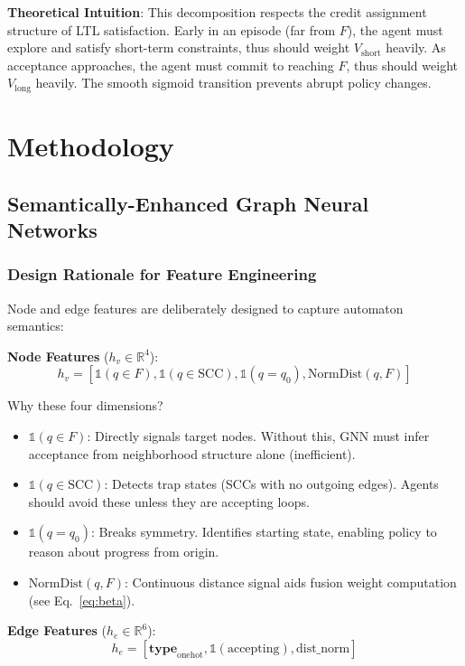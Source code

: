 \documentclass[conference]{IEEEtran}
\begin{document}
\textbf{Theoretical Intuition}: This decomposition respects the credit assignment structure of LTL satisfaction. Early in an episode (far from $F$), the agent must explore and satisfy short-term constraints, thus should weight $V_{\text{short}}$ heavily. As acceptance approaches, the agent must commit to reaching $F$, thus should weight $V_{\text{long}}$ heavily. The smooth sigmoid transition prevents abrupt policy changes.

\section{Methodology}
\label{sec:method}

\subsection{Semantically-Enhanced Graph Neural Networks}

\subsubsection{Design Rationale for Feature Engineering}

Node and edge features are deliberately designed to capture automaton semantics:

\textbf{Node Features} ($h_v \in \mathbb{R}^4$):
\begin{equation}
h_v = [\mathbb{1}(q \in F), \mathbb{1}(q \in \text{SCC}), \mathbb{1}(q = q_0), \text{NormDist}(q, F)]
\end{equation}

Why these four dimensions?
\begin{itemize}
    \item $\mathbb{1}(q \in F)$: Directly signals target nodes. Without this, GNN must infer acceptance from neighborhood structure alone (inefficient).
    \item $\mathbb{1}(q \in \text{SCC})$: Detects trap states (SCCs with no outgoing edges). Agents should avoid these unless they are accepting loops.
    \item $\mathbb{1}(q = q_0)$: Breaks symmetry. Identifies starting state, enabling policy to reason about progress from origin.
    \item $\text{NormDist}(q, F)$: Continuous distance signal aids fusion weight computation (see Eq.~\ref{eq:beta}).
\end{itemize}

\textbf{Edge Features} ($h_e \in \mathbb{R}^6$):
\begin{equation}
h_e = [\mathbf{type}_{\text{onehot}}, \mathbb{1}(\text{accepting}), \text{dist\_norm}]
\end{equation}
\end{document}
